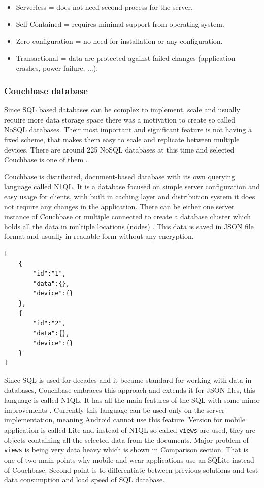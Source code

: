 \begin{itemize}
	\item Serverless = does not need second process for the server.
	\item Self-Contained = requires minimal support from operating system.
	\item Zero-configuration = no need for installation or any configuration.
	\item Transactional = data are protected against failed changes (application crashes, power failure, ...).
\end{itemize}

\subsubsection{Couchbase database}\label{subsec:CouchbaseDatabase}
Since SQL based databases can be complex to implement, scale and usually require more data storage space there was a motivation to create so called NoSQL databases. Their most important and significant feature is not having a fixed scheme, that makes them easy to scale and replicate between multiple devices. There are around 225 NoSQL databases at this time and selected Couchbase is one of them \cite{NOSQLDB}.

Couchbase is distributed, document-based database with its own querying language called N1QL. It is a database focused on simple server configuration and easy usage for clients, with built in caching layer and distribution system it does not require any changes in the application. There can be either one server instance of Couchbase or multiple connected to create a database cluster which holds all the data in multiple locations (nodes) \cite{GSWCBS}. This data is saved in JSON file format and usually in readable form without any encryption.

\begin{lstlisting}[caption=JSON format example]
[
	{
		"id":"1",
		"data":{},
		"device":{}
	},
	{
		"id":"2",
		"data":{},
		"device":{}
	}
]
\end{lstlisting}

Since SQL is used for decades and it became standard for working with data in databases, Couchbase embraces this approach and extends it for JSON files, this language is called N1QL. It has all the main features of the SQL with some minor improvements \cite{WINQL}. Currently this language can be used only on the server implementation, meaning Android cannot use this feature. Version for mobile application is called Lite and instead of N1QL so called \verb|views| are used, they are objects containing all the selected data from the documents. Major problem of \verb|views| is being very data heavy which is shown in \hyperref[subsubsec:Comparison]{Comparison} section. That is one of two main points why mobile and wear applications use an SQLite instead of Couchbase. Second point is to differentiate between previous solutions and test data consumption and load speed of SQL database.

